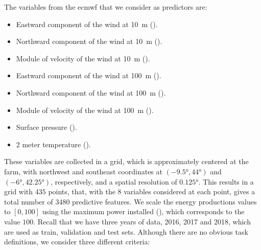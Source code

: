 The variables from the \acrshort{ecmwf} that we consider as predictors are:
\begin{itemize}
    \item	Eastward component of the wind at \si{10\metre} %
     ().
    \item	Northward  component of the wind at \si{10\metre} ().
    \item   Module of velocity of the wind at \si{10\metre} ().
    \item	Eastward  component of the wind at \si{100\metre} ().
    \item	Northward component of the wind at \si{100\metre} ().
    \item   Module of velocity of the wind at \si{100\metre} ().
    \item   Surface {pressure} ().
    \item	2 meter {temperature} ().
\end{itemize}
These variables are collected in a grid, which is approximately centered at the farm, with northwest and southeast coordinates at $(\ang{-9.5}, \ang{44})$ and $(\ang{-6}, \ang{42.25})$, respectively, and a spatial resolution of $\ang{0.125}$.
This results in a grid with $435$ points, that, with the $8$ variables considered at each point, gives a total number of {3480} predictive features.
We scale the energy productions values to $[0, 100]$ using the maximum power installed (), which corresponds to the value $100$.
%
Recall that we have three years of data, 2016, 2017 and 2018, which are used as train, validation and test sets.
%
Although there are no obvious task definitions, we consider three different criteria:
